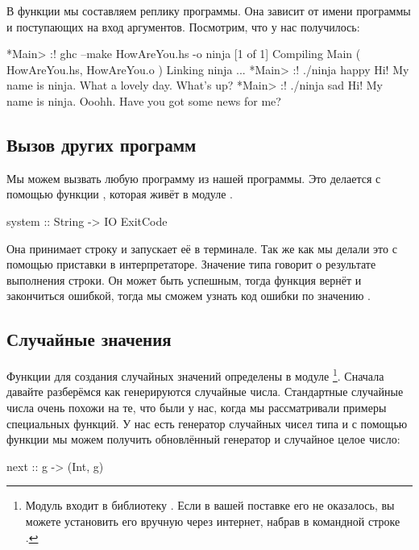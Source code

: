 В функции  мы составляем реплику программы.
Она зависит от имени программы и поступающих на
вход аргументов. Посмотрим, что у нас получилось:

\begin{code}
*Main> :! ghc --make HowAreYou.hs -o ninja 
[1 of 1] Compiling Main             ( HowAreYou.hs, HowAreYou.o )
Linking ninja ...
*Main> :! ./ninja happy
Hi! My name is ninja.
What a lovely day. What's up?
*Main> :! ./ninja sad
Hi! My name is ninja.
Ooohh. Have you got some news for me?
\end{code}

\subsection{Вызов других программ}

Мы можем вызвать любую программу из нашей программы. 
Это делается с помощью функции , которая 
живёт в модуле . 

\begin{code}
system :: String -> IO ExitCode
\end{code}

Она принимает строку и запускает её в терминале. Так же
как мы делали это с помощью приставки \In{:!} в интерпретаторе.
Значение типа  говорит о результате выполнения 
строки. Он может быть успешным, тогда функция вернёт 
 и закончиться ошибкой, тогда мы сможем
узнать код ошибки по значению .

\subsection{Случайные значения}

Функции для создания случайных значений определены в
модуле %
\footnote{Модуль  входит в библиотеку .%
Если в вашей поставке  его не оказалось, вы можете
установить его вручную через интернет, набрав в командной строке .}. 
Сначала давайте разберёмся как генерируются
случайные числа.
Стандартные случайные числа очень похожи на те, что были
у нас, когда мы рассматривали примеры специальных функций. 
У нас есть генератор случайных чисел типа  и с помощью функции
 мы можем получить обновлённый генератор и
случайное целое число:

\begin{code}
next :: g -> (Int, g)
\end{code}

